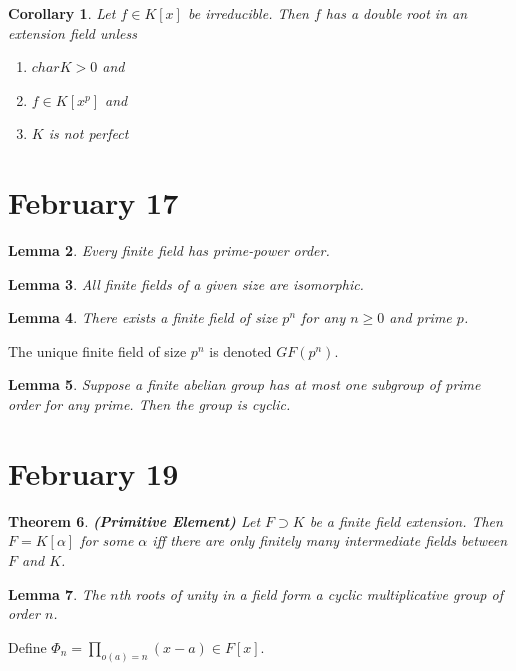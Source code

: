 \documentclass[letterpaper]{article}
\newtheorem{theorem}{Theorem}[section]
\newtheorem{lemma}[theorem]{Lemma}
\newtheorem{corollary}[theorem]{Corollary}
\begin{document}
\begin{corollary}
Let $f \in K[x]$ be irreducible. Then $f$ has a double root in an extension field unless
\begin{enumerate}
\item $char K > 0$ and
\item $f \in K[x^p]$ and
\item $K$ is not perfect
\end{enumerate}
\end{corollary}

\section{February 17}

\begin{lemma}
Every finite field has prime-power order.
\end{lemma}

\begin{lemma}
All finite fields of a given size are isomorphic.
\end{lemma}

\begin{lemma}
There exists a finite field of size $p^n$ for any $n \ge 0$ and prime $p$.
\end{lemma}

The unique finite field of size $p^n$ is denoted $GF(p^n)$.

\begin{lemma}
Suppose a finite abelian group has at most one subgroup of prime order for any prime. Then the group is cyclic.
\end{lemma}

\section{February 19}

\begin{theorem}
\emph{\textbf{(Primitive Element)}}
Let $F \supset K$ be a finite field extension. Then $F = K[\alpha]$ for some $\alpha$ iff there are only finitely many intermediate fields between $F$ and $K$.
\end{theorem}

\begin{lemma}
The $n$th roots of unity in a field form a cyclic multiplicative group of order $n$.
\end{lemma}

Define $\Phi_n = \displaystyle\prod_{o(a) = n} (x - a) \in F[x]$.
\end{document}
